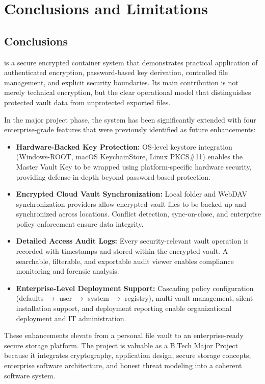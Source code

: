 \setcounter{equation}{0}
\chapter{Conclusions and Limitations}
\section{Conclusions}
\projname{} is a secure encrypted container system that demonstrates practical application of authenticated encryption, password-based key derivation, controlled file management, and explicit security boundaries. Its main contribution is not merely technical encryption, but the clear operational model that distinguishes protected vault data from unprotected exported files.

In the major project phase, the system has been significantly extended with four enterprise-grade features that were previously identified as future enhancements:
\begin{itemize}
  \item \textbf{Hardware-Backed Key Protection:} OS-level keystore integration (Windows-ROOT, macOS KeychainStore, Linux PKCS\#11) enables the Master Vault Key to be wrapped using platform-specific hardware security, providing defense-in-depth beyond password-based protection.
  \item \textbf{Encrypted Cloud Vault Synchronization:} Local folder and WebDAV synchronization providers allow encrypted vault files to be backed up and synchronized across locations. Conflict detection, sync-on-close, and enterprise policy enforcement ensure data integrity.
  \item \textbf{Detailed Access Audit Logs:} Every security-relevant vault operation is recorded with timestamps and stored within the encrypted vault. A searchable, filterable, and exportable audit viewer enables compliance monitoring and forensic analysis.
  \item \textbf{Enterprise-Level Deployment Support:} Cascading policy configuration (defaults $\rightarrow$ user $\rightarrow$ system $\rightarrow$ registry), multi-vault management, silent installation support, and deployment reporting enable organizational deployment and IT administration.
\end{itemize}

These enhancements elevate \projname{} from a personal file vault to an enterprise-ready secure storage platform. The project is valuable as a B.Tech Major Project because it integrates cryptography, application design, secure storage concepts, enterprise software architecture, and honest threat modeling into a coherent software system.

